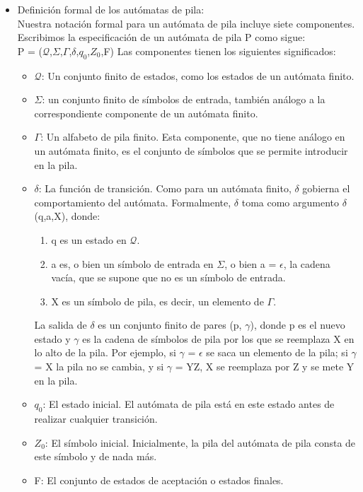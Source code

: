 \documentclass[12pt,a4paper,spanish]{book}
\begin{document}
\begin{itemize}
\item Definici\'on formal de los aut\'omatas de pila:\\

Nuestra notaci\'on formal para un aut\'omata de pila incluye siete componentes.
Escribimos la especificaci\'on de un aut\'omata de pila P como sigue:\\

P = ($\mathcal{Q}$,$\Sigma$,$\Gamma$,$\delta$,$q_{0}$,$Z_{0}$,F)
Las componentes tienen los siguientes significados:
\begin{itemize}
\item $\mathcal{Q}$: Un conjunto finito de estados, como los estados de un aut\'omata finito.
\item $\Sigma$: un conjunto finito de s\'imbolos de entrada, tambi\'en an\'alogo a la
correspondiente componente de un aut\'omata finito.
\item $\Gamma$: Un alfabeto de pila finito. Esta componente, que no tiene an\'alogo
en un aut\'omata finito, es el conjunto de s\'imbolos que se permite introducir en la pila.
\item $\delta$: La funci\'on de transici\'on. Como para un aut\'omata finito, $\delta$
gobierna el comportamiento del aut\'omata. Formalmente, $\delta$ toma como
argumento $\delta$(q,a,X), donde:
\begin{enumerate}
\item q es un estado en $\mathcal{Q}$.
\item a es, o bien un s\'imbolo de entrada en $\Sigma$, o bien a = $\epsilon$, la
cadena vac\'ia, que se supone que no es un s\'imbolo de entrada.
\item X es un s\'imbolo de pila, es decir, un elemento de $\Gamma$.
\end{enumerate}
La salida de $\delta$ es un conjunto finito de pares (p, $\gamma$), donde p es el
nuevo estado y $\gamma$ es la cadena de s\'imbolos de pila por los que se reemplaza
X en lo alto de la pila. Por ejemplo, si $\gamma$ = $\epsilon$ se saca un elemento de
la pila; si $\gamma$ = X la pila no se cambia, y si $\gamma$ = YZ, X se reemplaza por
Z y se mete Y en la pila.
\item $q_{0}$: El estado inicial. El aut\'omata de pila est\'a en este estado antes de
realizar cualquier transici\'on.
\item $Z_{0}$: El s\'imbolo inicial. Inicialmente, la pila del aut\'omata de pila consta de
este s\'imbolo y de nada m\'as.
\item F: El conjunto de estados de aceptaci\'on o estados finales.
\end{itemize}


\end{itemize}
\end{document}
